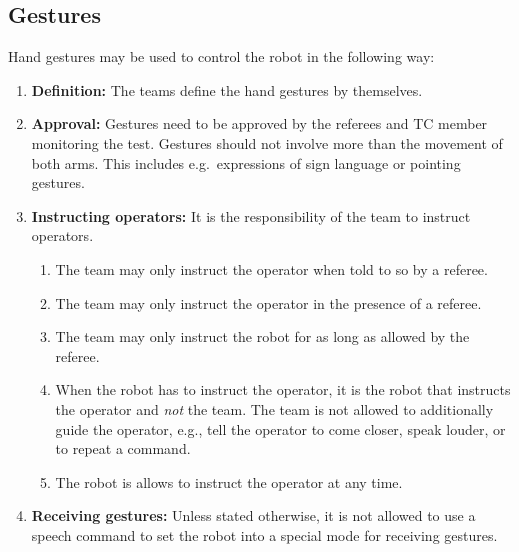 \subsection{Gestures}
\label{rule:gestures}
Hand gestures may be used to control the robot in the following way:
\begin{enumerate}
	\item \textbf{Definition:} The teams define the hand gestures by themselves. 
	\item \textbf{Approval:} Gestures need to be approved by the referees and TC member monitoring the test. Gestures should not involve more than the movement of both arms. This includes e.g.~expressions of sign language or pointing gestures.
	\item \textbf{Instructing operators:} It is the responsibility of the team to instruct operators.
	\begin{enumerate}
		\item The team may only instruct the operator when told to so by a referee.
		\item The team may only instruct the operator in the presence of a referee.
		\item The team may only instruct the robot for as long as allowed by the referee.
		\item When the robot has to instruct the operator, it is the robot that instructs the operator and \emph{not} the team. The team is not allowed to additionally guide the operator, e.g., tell the operator to come closer, speak louder, or to repeat a command.
		\item The robot is allows to instruct the operator at any time.
	\end{enumerate}
	\item \textbf{Receiving gestures:} Unless stated otherwise, it is not allowed to use a speech command to set the robot into a special mode for receiving gestures.
\end{enumerate}



